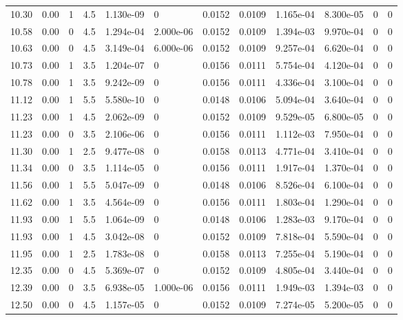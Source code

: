 \documentclass[preview]{standalone}
\begin{document}
{{{{\begin{tabular}{L{1.2cm}C{1.2cm} C{0.3cm}C{0.5cm} C{1.4cm}C{1.4cm} C{1.4cm}C{1.4cm} C{1.6cm}C{1.6cm} C{1.6cm}C{1.6cm}}
  10.30  &  0.00  & 1     & 4.5 &  1.130e-09  & 0  &  0.0152&   0.0109& 1.165e-04 & 8.300e-05   &  0 & 0  \\ 
  10.58  &  0.00  & 0     & 4.5 &  1.294e-04  & 2.000e-06  &  0.0152&   0.0109& 1.394e-03 & 9.970e-04   &  0 & 0  \\ 
  10.63  &  0.00  & 0     & 4.5 &  3.149e-04  & 6.000e-06  &  0.0152&   0.0109& 9.257e-04 & 6.620e-04   &  0 & 0  \\ 
  10.73  &  0.00  & 1     & 3.5 &  1.204e-07  & 0  &  0.0156&   0.0111& 5.754e-04 & 4.120e-04   &  0 & 0  \\ 
  10.78  &  0.00  & 1     & 3.5 &  9.242e-09  & 0  &  0.0156&   0.0111& 4.336e-04 & 3.100e-04   &  0 & 0  \\ 
  11.12  &  0.00  & 1     & 5.5 &  5.580e-10  & 0  &  0.0148&   0.0106& 5.094e-04 & 3.640e-04   &  0 & 0  \\ 
  11.23  &  0.00  & 1     & 4.5 &  2.062e-09  & 0  &  0.0152&   0.0109& 9.529e-05 & 6.800e-05   &  0 & 0  \\ 
  11.23  &  0.00  & 0     & 3.5 &  2.106e-06  & 0  &  0.0156&   0.0111& 1.112e-03 & 7.950e-04   &  0 & 0  \\ 
  11.30  &  0.00  & 1     & 2.5 &  9.477e-08  & 0  &  0.0158&   0.0113& 4.771e-04 & 3.410e-04   &  0 & 0  \\ 
  11.34  &  0.00  & 0     & 3.5 &  1.114e-05  & 0  &  0.0156&   0.0111& 1.917e-04 & 1.370e-04   &  0 & 0  \\ 
  11.56  &  0.00  & 1     & 5.5 &  5.047e-09  & 0  &  0.0148&   0.0106& 8.526e-04 & 6.100e-04   &  0 & 0  \\ 
  11.62  &  0.00  & 1     & 3.5 &  4.564e-09  & 0  &  0.0156&   0.0111& 1.803e-04 & 1.290e-04   &  0 & 0  \\ 
  11.93  &  0.00  & 1     & 5.5 &  1.064e-09  & 0  &  0.0148&   0.0106& 1.283e-03 & 9.170e-04   &  0 & 0  \\ 
  11.93  &  0.00  & 1     & 4.5 &  3.042e-08  & 0  &  0.0152&   0.0109& 7.818e-04 & 5.590e-04   &  0 & 0  \\ 
  11.95  &  0.00  & 1     & 2.5 &  1.783e-08  & 0  &  0.0158&   0.0113& 7.255e-04 & 5.190e-04   &  0 & 0  \\ 
  12.35  &  0.00  & 0     & 4.5 &  5.369e-07  & 0  &  0.0152&   0.0109& 4.805e-04 & 3.440e-04   &  0 & 0  \\ 
  12.39  &  0.00  & 0     & 3.5 &  6.938e-05  & 1.000e-06  &  0.0156&   0.0111& 1.949e-03 & 1.394e-03   &  0 & 0  \\ 
  12.50  &  0.00  & 0     & 4.5 &  1.157e-05  & 0  &  0.0152&   0.0109& 7.274e-05 & 5.200e-05   &  0 & 0  \\ 

\end{tabular}}}}}
\end{document}
